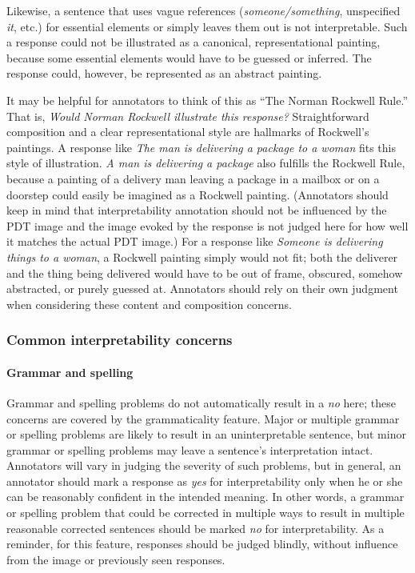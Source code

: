 \documentclass[12pt]{article}
\begin{document}
Likewise, a sentence that uses vague references (\textit{someone/something}, unspecified \textit{it}, etc.) for essential elements or simply leaves them out is not interpretable. Such a response could not be illustrated as a canonical, representational painting, because some essential elements would have to be guessed or inferred. The response could, however, be represented as an abstract painting. 

It may be helpful for annotators to think of this as ``The Norman Rockwell Rule.'' That is, \textit{Would Norman Rockwell illustrate this response?} Straightforward composition and a clear representational style are hallmarks of Rockwell's paintings. A response like \textit{The man is delivering a package to a woman} fits this style of illustration. \textit{A man is delivering a package} also fulfills the Rockwell Rule, because a painting of a delivery man leaving a package in a mailbox or on a doorstep could easily be imagined as a Rockwell painting. (Annotators should keep in mind that interpretability annotation should not be influenced by the PDT image and the image evoked by the response is not judged here for how well it matches the actual PDT image.) For a response like \textit{Someone is delivering things to a woman}, a Rockwell painting simply would not fit; both the deliverer and the thing being delivered would have to be out of frame, obscured, somehow abstracted, or purely guessed at. Annotators should rely on their own judgment when considering these content and composition concerns.

\subsubsection{Common interpretability concerns}

\paragraph{Grammar and spelling} \label{para:interp-grammar} Grammar and spelling problems do not automatically result in a \textit{no} here; these concerns are covered by the grammaticality feature. Major or multiple grammar or spelling problems are likely to result in an uninterpretable sentence, but minor grammar or spelling problems may leave a sentence's interpretation intact. Annotators will vary in judging the severity of such problems, but in general, an annotator should mark a response as \textit{yes} for interpretability only when he or she can be reasonably confident in the intended meaning. In other words, a grammar or spelling problem that could be corrected in multiple ways to result in multiple reasonable corrected sentences should be marked \textit{no} for interpretability. As a reminder, for this feature, responses should be judged blindly, without influence from the image or previously seen responses.
\end{document}

